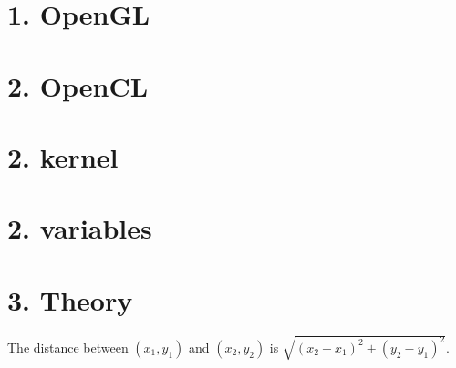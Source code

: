 \hypertarget{md___users__erik__documents__p_r_o_j_e_c_t_s__bookhouse_boys_ezor__neutrino__docs__documentation_opengl}{}\section{1. Open\+GL}\label{md___users__erik__documents__p_r_o_j_e_c_t_s__bookhouse_boys_ezor__neutrino__docs__documentation_opengl}
\hypertarget{md___users__erik__documents__p_r_o_j_e_c_t_s__bookhouse_boys_ezor__neutrino__docs__documentation_opencl}{}\section{2. Open\+CL}\label{md___users__erik__documents__p_r_o_j_e_c_t_s__bookhouse_boys_ezor__neutrino__docs__documentation_opencl}
\hypertarget{md___users__erik__documents__p_r_o_j_e_c_t_s__bookhouse_boys_ezor__neutrino__docs__documentation_opencl_kernel}{}\section{2. kernel}\label{md___users__erik__documents__p_r_o_j_e_c_t_s__bookhouse_boys_ezor__neutrino__docs__documentation_opencl_kernel}
\hypertarget{md___users__erik__documents__p_r_o_j_e_c_t_s__bookhouse_boys_ezor__neutrino__docs__documentation_opencl_variables}{}\section{2. variables}\label{md___users__erik__documents__p_r_o_j_e_c_t_s__bookhouse_boys_ezor__neutrino__docs__documentation_opencl_variables}
\hypertarget{md___users__erik__documents__p_r_o_j_e_c_t_s__bookhouse_boys_ezor__neutrino__docs__documentation_theory}{}\section{3. Theory}\label{md___users__erik__documents__p_r_o_j_e_c_t_s__bookhouse_boys_ezor__neutrino__docs__documentation_theory}
The distance between $(x_1,y_1)$ and $(x_2,y_2)$ is $\sqrt{(x_2-x_1)^2+(y_2-y_1)^2}$. 